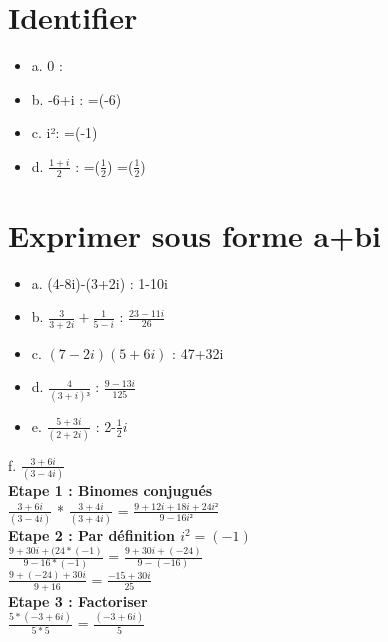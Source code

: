 \section{Identifier \R $  $ \I}

\begin{itemize}
\item {a. 0 :   }
\item {b. -6+i : \R=(-6) }
\item {c. i²: \R=(-1) }
\item {d. $\frac{1+i}{2}$ : \R=($\frac{1}{2}$) \I=($\frac{1}{2}$)}
\end{itemize}


\section{Exprimer sous forme a+bi}

\begin{itemize}
\item {a. (4-8i)-(3+2i) : 1-10i}
\item {b. $\frac{3}{3+2i} + \frac{1}{5-i}$ : $\frac{23-11i}{26}$}
\item {c. $(7-2i)(5+6i)$ : 47+32i}
\item {d. $\frac{4}{(3+i)³}$ : $\frac{9-13i}{125}$}
\item {e. $\frac{5+3i}{(2+2i)}$ : 2-$\frac{1}{2}i$}
\end{itemize}
\vspace{8mm} %

f. $\frac{3+6i}{(3-4i)} $ \\

\textbf{Etape 1 : Binomes conjugués} \\

$\frac{3+6i}{(3-4i)}$ * $\frac{3+4i}{(3+4i)}$ = $\frac{9+12i+18i+24i²}{9-16i²}$ \\

\textbf{Etape 2 : Par définition $i^{2} = (-1)$} \\

$\frac{9+30i+(24*(-1)}{9-16*(-1)}$  = $\frac{9+30i+(-24)}{9-(-16)}$ \\

$\frac{9+(-24)+30i}{9+16}$  = $\frac{-15+30i}{25}$ \\

\textbf{Etape 3 : Factoriser} \\

$\frac{5*(-3+6i)}{5*5}$ = $\frac{(-3+6i)}{5}$ \\

